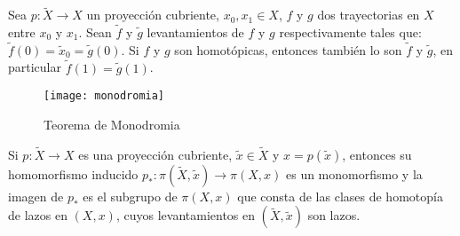 \begin{theorem}[Monodromia]\label{Monodromia}
Sea $p:\widetilde{X} \rightarrow X$ un proyecci\'on cubriente, $x_0,x_1 \in X$, $f$ y $g$ dos 
trayectorias en $X$ entre $x_0$ y $x_1$. Sean $\widetilde{f}$ y $\widetilde{g}$ levantamientos de $f$ y 
$g$ respectivamente tales que: $\widetilde{f}(0) = \widetilde x_0 = \widetilde{g}(0)$. Si $f$ y $g$ son 
homot\'opicas, entonces tambi\'en lo son $\widetilde{f}$ y $\widetilde{g}$, en particular $\widetilde{f}
(1)=\widetilde{g}(1)$.\\

\begin{figure}[h]
\begin{center}
      \texttt{[image: monodromia]}
\end{center}
\caption{Teorema de Monodromia}
\end{figure} 




\end{theorem}

\begin{corollary}\label{ProyMono}

Si $p:\widetilde{X} \rightarrow X$ es una proyecci\'on cubriente, $\widetilde{x} \in \widetilde{X}$ y $x=p(\widetilde{x})$, entonces su homomorfismo inducido 
$p_*: \pi(\widetilde{X},\widetilde{x}) \rightarrow \pi (X,x)$ es un monomorfismo y la imagen de $p_*$ es el subgrupo de $\pi (X,x)$ que consta de las clases de homotop\'ia de lazos en $(X,x)$, cuyos levantamientos en $(\widetilde{X}, \widetilde{x})$ son lazos.\\ 

\end{corollary}

